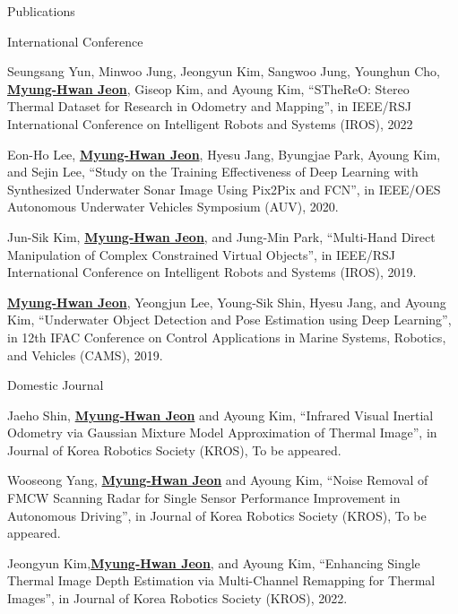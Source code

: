 \begin{rSection}{Publications}
\begin{pubSubsection}{International Conference}
  \item Seungsang Yun, Minwoo Jung, Jeongyun Kim, Sangwoo Jung, Younghun Cho, \underline{\textbf{Myung-Hwan Jeon}}, Giseop Kim, and Ayoung Kim, “STheReO: Stereo Thermal Dataset for Research in Odometry and Mapping”, in IEEE/RSJ International Conference on Intelligent Robots and Systems (IROS), 2022
  
  \item Eon-Ho Lee, \underline{\textbf{Myung-Hwan Jeon}}, Hyesu Jang, Byungjae Park, Ayoung Kim, and Sejin Lee, “Study on the Training Effectiveness of Deep Learning with Synthesized Underwater Sonar Image Using Pix2Pix and FCN”, in IEEE/OES Autonomous Underwater Vehicles Symposium (AUV), 2020.
  
  \item Jun-Sik Kim, \underline{\textbf{Myung-Hwan Jeon}}, and Jung-Min Park, “Multi-Hand Direct Manipulation of Complex Constrained Virtual Objects”, in IEEE/RSJ International Conference on Intelligent Robots and Systems (IROS), 2019.
  
  \item \underline{\textbf{Myung-Hwan Jeon}}, Yeongjun Lee, Young-Sik Shin, Hyesu Jang, and Ayoung Kim, “Underwater Object Detection and Pose Estimation using Deep Learning”, in 12th IFAC Conference on Control Applications in Marine Systems, Robotics, and Vehicles (CAMS), 2019.

\end{pubSubsection}

\begin{pubSubsection}{Domestic Journal}

  \item Jaeho Shin, \underline{\textbf{Myung-Hwan Jeon}} and Ayoung Kim, “Infrared Visual Inertial Odometry via Gaussian Mixture Model Approximation of Thermal Image”, in Journal of Korea Robotics Society (KROS), To be appeared.
  
  \item Wooseong Yang, \underline{\textbf{Myung-Hwan Jeon}} and Ayoung Kim, “Noise Removal of FMCW Scanning Radar for Single Sensor Performance Improvement in Autonomous Driving”, in Journal of Korea Robotics Society (KROS), To be appeared.

  \item Jeongyun Kim,\underline{\textbf{Myung-Hwan Jeon}}, and Ayoung Kim, “Enhancing Single Thermal Image Depth Estimation via Multi-Channel Remapping for Thermal Images”, in Journal of Korea Robotics Society (KROS), 2022.
  

\end{pubSubsection}
\end{rSection}
